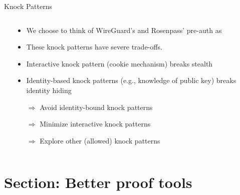 \begin{frame}{Knock Patterns}
\begin{columns}[fullwidth,c]
    \begin{column}{.45\linewidth}
    \end{column}%
    \begin{column}{.5\linewidth}
      \begin{itemize}
        \item We choose to think of WireGuard's and Rosenpass' pre-auth as 
        \item These knock patterns have severe trade-offs.
        \item Interactive knock pattern (cookie mechanism) breaks stealth
        \item Identity-based knock patterns (e.g., knowledge of public key) breaks identity hiding
        \vspace{0.5em}
        \item[$\Rightarrow$] Avoid identity-bound knock patterns
        \item[$\Rightarrow$] Minimize interactive knock patterns
        \item[$\Rightarrow$] Explore other (allowed) knock patterns
      \end{itemize}
    \end{column}
  \end{columns}
\end{frame}

\hypertarget{section-better-proof-tools}{%
\section{Section: Better proof tools}\label{section-better-proof-tools}}

